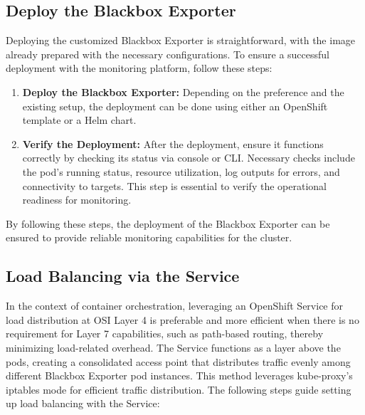 \subsection{Deploy the Blackbox Exporter}

Deploying the customized Blackbox Exporter is straightforward, with the image already prepared with the necessary configurations. To ensure a successful deployment with the monitoring platform, follow these steps: 

\begin{enumerate}
    \item \textbf{Deploy the Blackbox Exporter:}
    Depending on the preference and the existing setup, the deployment can be done using either an OpenShift template or a Helm chart. 
    \item \textbf{Verify the Deployment:}
    After the deployment, ensure it functions correctly by checking its status via console or \ac{CLI}. Necessary checks include the pod's running status, resource utilization, log outputs for errors, and connectivity to targets. This step is essential to verify the operational readiness for monitoring. 
\end{enumerate}

By following these steps, the deployment of the Blackbox Exporter can be ensured to provide reliable monitoring capabilities for the cluster.

\subsection{Load Balancing via the Service}

In the context of container orchestration, leveraging an OpenShift Service for load distribution at \ac{OSI} Layer 4 is preferable and more efficient when there is no requirement for Layer 7 capabilities, such as path-based routing, thereby minimizing load-related overhead. The Service functions as a layer above the pods, creating a consolidated access point that distributes traffic evenly among different Blackbox Exporter pod instances. This method leverages kube-proxy's iptables mode for efficient traffic distribution. The following steps guide setting up load balancing with the Service: 

